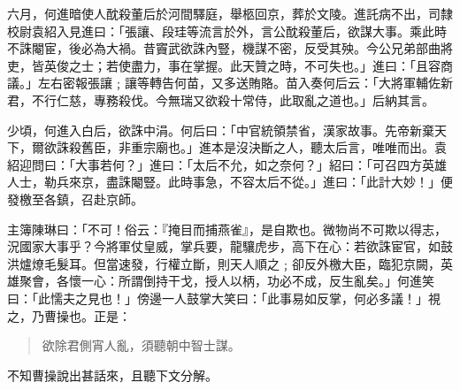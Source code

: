 六月，何進暗使人酖殺董后於河間驛庭，舉柩回京，葬於文陵。進託病不出，司隸校尉袁紹入見進曰：「張讓、段珪等流言於外，言公酖殺董后，欲謀大事。乘此時不誅閹宦，後必為大禍。昔竇武欲誅內豎，機謀不密，反受其殃。今公兄弟部曲將吏，皆英俊之士；若使盡力，事在掌握。此天贊之時，不可失也。」進曰：「且容商議。」左右密報張讓﹔讓等轉告何苗，又多送賄賂。苗入奏何后云：「大將軍輔佐新君，不行仁慈，專務殺伐。今無瑞又欲殺十常侍，此取亂之道也。」后納其言。

少頃，何進入白后，欲誅中涓。何后曰：「中官統領禁省，漢家故事。先帝新棄天下，爾欲誅殺舊臣，非重宗廟也。」進本是沒決斷之人，聽太后言，唯唯而出。袁紹迎問曰：「大事若何？」進曰：「太后不允，如之奈何？」紹曰：「可召四方英雄人士，勒兵來京，盡誅閹豎。此時事急，不容太后不從。」進曰：「此計大妙！」便發檄至各鎮，召赴京師。

主簿陳琳曰：「不可！俗云：『掩目而捕燕雀』，是自欺也。微物尚不可欺以得志，況國家大事乎？今將軍仗皇威，掌兵要，龍驤虎步，高下在心：若欲誅宦官，如鼓洪爐燎毛髮耳。但當速發，行權立斷，則天人順之﹔卻反外檄大臣，臨犯京闕，英雄聚會，各懷一心：所謂倒持干戈，授人以柄，功必不成，反生亂矣。」何進笑曰：「此懦夫之見也！」傍邊一人鼓掌大笑曰：「此事易如反掌，何必多議！」視之，乃曹操也。正是：

\begin{quote}
欲除君側宵人亂，須聽朝中智士謀。
\end{quote}

不知曹操說出甚話來，且聽下文分解。
